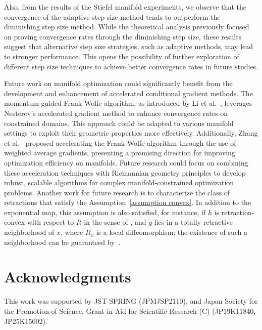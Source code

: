 \documentclass[pdflatex,sn-mathphys-num]{sn-jnl}%
\theoremstyle{definition} %
\theoremstyle{remark} %
\begin{document}
Also, from the results of the Stiefel manifold experiments, we observe that the convergence of the adaptive step size method tends to outperform the diminishing step size method. While the theoretical analysis previously focused on proving convergence rates through the diminishing step size, these results suggest that alternative step size strategies, such as adaptive methods, may lead to stronger performance. This opens the possibility of further exploration of different step size techniques to achieve better convergence rates in future studies.

Future work on manifold optimization could significantly benefit from the development and enhancement of accelerated conditional gradient methods. The momentum-guided Frank-Wolfe algorithm, as introduced by Li et al.~\cite{li2021momentum}, leverages Nesterov's accelerated gradient method to enhance convergence rates on constrained domains. This approach could be adapted to various manifold settings to exploit their geometric properties more effectively. Additionally, Zhang et al.~\cite{zhang2021accelerating} proposed accelerating the Frank-Wolfe algorithm through the use of weighted average gradients, presenting a promising direction for improving optimization efficiency on manifolds. Future research could focus on combining these acceleration techniques with Riemannian geometry principles to develop robust, scalable algorithms for complex manifold-constrained optimization problems. 
Another work for future research is to characterize the class of retractions that satisfy the Assumption~\ref{assumption convex}.
In addition to the exponential map, this assumption is also satisfied, for instance, if \( h \) is retraction-convex with respect to \( R \) in the sense of \cite[Definition 4.3.1]{huang2013optimization},
and \( y \) lies in a totally retractive neighborhood of $x$, where $R_x$ is a local diffeomorphism; the existence of such a neighborhood can be guaranteed by~\cite[Theorem 3.3.7]{flaherty2013riemannian}.


\section*{Acknowledgments} 
\noindent 
This work was supported by JST SPRING (JPMJSP2110), and Japan Society for the Promotion of Science, 
Grant-in-Aid for Scientific Research (C) (JP19K11840, JP25K15002).
\end{document}
